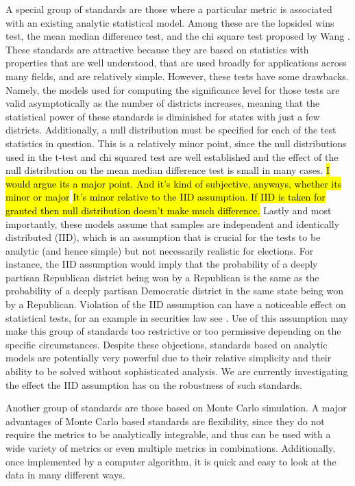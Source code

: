 \documentclass[preprint,12pt]{article}
\newcommand{\CM}[2][green]{ {\sethlcolor{#1} \hl{#2}} }
\newcommand{\KB}[2][cyan]{ {\sethlcolor{#1} \hl{#2}} }
\begin{document}
A special group of standards are those where a particular metric is associated with an existing analytic statistical model.
Among these are the lopsided wins test, the mean median difference test, and the chi square test proposed by Wang \cite{Wang__,Wang_2016_10.1089/elj.2016.0387}.
These standards are attractive because they are based on statistics with properties that are well understood, that are used broadly for applications across many fields, and are relatively simple.
However, these tests have some drawbacks.
Namely, the models used for computing the significance level for those tests are valid asymptotically as the number of districts increases, meaning that the statistical power of these standards is diminished for states with just a few districts.
Additionally, a null distribution must be specified for each of the test statistics in question. 
This is a relatively minor point, since the null distributions used in the t-test and chi squared test are well established and the effect of the null distribution on the mean median difference test is small in many cases. \cite{Cabilio_1996_10.2307/3315744,Zheng_2010_}
\KB{I would argue its a major point.   And it's kind of subjective, anyways, whether its minor or major}
\CM{It's minor relative to the IID assumption. If IID is taken for granted then null distribution doesn't make much difference.}
Lastly and most importantly, these models assume that samples are independent and identically distributed (IID), which is an assumption that is crucial for the tests to be analytic (and hence simple) but not necessarily realistic for elections.
For instance, the IID assumption would imply that the probability of a deeply partisan Republican district being won by a Republican is the same as the probability of a deeply partisan Democratic district in the same state being won by a Republican.
Violation of the IID assumption can have a noticeable effect on statistical tests, for an example in securities law see \cite{Gel_2009_10.1093/lpr/mgp008}. 
Use of this assumption may make this group of standards too restrictive or too permissive depending on the specific circumstances.
Despite these objections, standards based on analytic models are potentially very powerful due to their relative simplicity and their ability to be solved without sophisticated analysis.
We are currently investigating the effect the IID assumption has on the robustness of such standards.

Another group of standards are those based on Monte Carlo simulation.
A major advantages of Monte Carlo based standards are flexibility, since they do not require the metrics to be analytically integrable, and thus can be used with a wide variety of metrics or even multiple metrics in combinations.
Additionally, once implemented by a computer algorithm, it is quick and easy to look at the data in many different ways.
\end{document}
